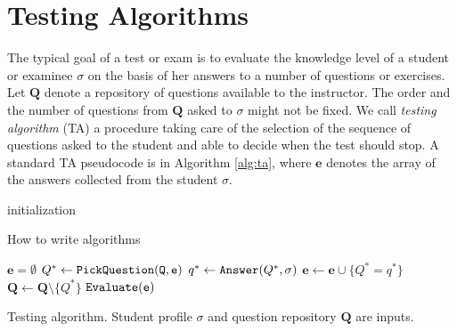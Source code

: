 \documentclass[runningheads]{llncs}
\begin{document}
\section{Testing Algorithms}
The typical goal of a test or exam is to evaluate the knowledge level of a student or examinee $\sigma$ on the basis of her answers to a number of questions or exercises. Let $\bm{Q}$ denote a repository of questions available to the instructor. The order and the number of questions from $\bm{Q}$ asked to $\sigma$ might not be fixed. We call \emph{testing algorithm} (TA) a procedure taking care of the selection of the sequence of questions asked to the student and able to decide when the test should stop. A standard TA pseudocode is in Algorithm \ref{alg:ta}, where $\bm{e}$ denotes the array of the answers collected from the student $\sigma$.



\begin{algorithm}[H]
    \SetAlgoLined
    initialization\;
    \caption{How to write algorithms}
\end{algorithm}

\begin{algorithm}[htp]
    \begin{algorithmic}[1]
    \STATE $\bm{e}=\emptyset$
        \STATE $Q^* \gets \tt{PickQuestion}(\bm{Q},\bm{e})$
        \STATE $q^* \gets {\tt{Answer}}(Q^*,\sigma)$
        \STATE $\bm{e} \gets \bm{e} \cup \{ Q^*=q^* \}$
        \STATE $\bm{Q} \gets \bm{Q} \setminus \{ Q^*\}$
        \ENDWHILE
         $\tt{Evaluate}(\bm{e})$
    \end{algorithmic}\label{alg:ta}
\caption{Testing algorithm. Student profile $\sigma$ and question repository $\bm{Q}$ are inputs.}
\end{algorithm}
\end{document}
